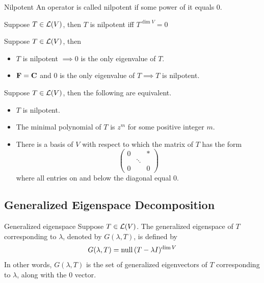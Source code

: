 \documentclass[12pt,a4paper]{article}
\begin{document}
    \begin{defi}{Nilpotent}
        An operator is called nilpotent if some power of it equals $0$.
    \end{defi}
    \begin{remark}
        Suppose $T\in\mathcal{L}(V)$, then $T$ is nilpotent iff $T^{\dim V}=0$
    \end{remark}
    \hfill
    
    \begin{prop}
        Suppose $T\in\mathcal{L}(V)$, then
        \begin{itemize}
            \item $T$ is nilpotent $\implies0$ is the only eigenvalue of $T$.
            \item $\mathbf{F}=\mathbf{C}$ and $0$ is the only eigenvalue of $T\implies T$ is nilpotent.
        \end{itemize}
    \end{prop}
    \hfill

    \begin{prop}
        Suppose $T\in\mathcal{L}(V)$, then the following are equivalent.
        \begin{itemize}
            \item $T$ is nilpotent.
            \item The minimal polynomial of $T$ is $z^m$ for some positive integer $m$.
            \item There is a basis of $V$ with respect to which the matrix of $T$ has the form
            $$
            \begin{pmatrix}
                0 & & *\\
                 & \ddots & \\
                0 & & 0
            \end{pmatrix}
            $$
            where all entries on and below the diagonal equal $0$.  
        \end{itemize}
    \end{prop}
    \hfill

    \subsection{Generalized Eigenspace Decomposition}
    \begin{defi}{Generalized eigenspace}
        Suppose $T\in\mathcal{L}(V)$. The generalized eigenspace of $T$ corresponding to $\lambda$, denoted by $G(\lambda,T)$, is defined by
        $$
        G(\lambda,T)=\operatorname{null\,} (T-\lambda I)^{\dim V}
        $$
        In other words, $G(\lambda,T)$ is the set of generalized eigenvectors of $T$ corresponding to $\lambda$, along with the $0$ vector.
    \end{defi}
    \hfill
    
\end{document}
